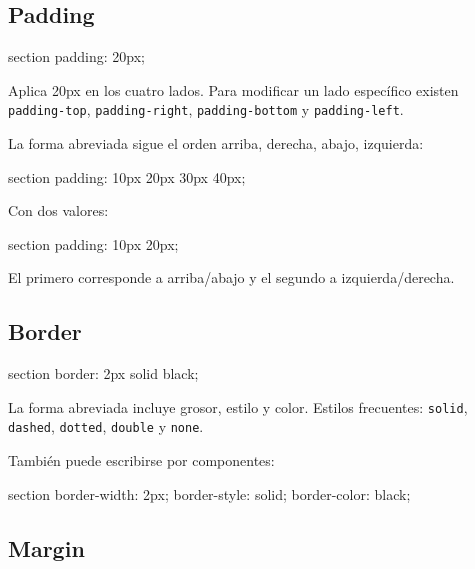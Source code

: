 \documentclass[11pt]{article}
\begin{document}
    \subsection{Padding}

    \begin{csscodedark}
        section {
            padding: 20px;
        }
    \end{csscodedark}

    Aplica 20px en los cuatro lados. Para modificar un lado específico existen
    \texttt{padding-top}, \texttt{padding-right}, \texttt{padding-bottom} y
    \texttt{padding-left}.

    La forma abreviada sigue el orden arriba, derecha, abajo, izquierda:

    \begin{csscodedark}
        section {
            padding: 10px 20px 30px 40px;
        }
    \end{csscodedark}

    Con dos valores:

    \begin{csscodedark}
        section {
            padding: 10px 20px;
        }
    \end{csscodedark}

    El primero corresponde a arriba/abajo y el segundo a izquierda/derecha.

    \subsection{Border}

    \begin{csscodedark}
        section {
            border: 2px solid black;
        }
    \end{csscodedark}

    La forma abreviada incluye grosor, estilo y color. Estilos frecuentes: \texttt{solid}, \texttt{dashed}, \texttt{dotted}, \texttt{double} y \texttt{none}.

    También puede escribirse por componentes:

    \begin{csscodedark}
        section {
            border-width: 2px;
            border-style: solid;
            border-color: black;
        }
    \end{csscodedark}

    \subsection{Margin}
\end{document}
